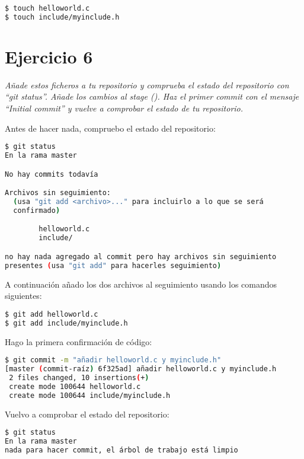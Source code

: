 \begin{lstlisting}[xleftmargin=.16\textwidth,language=bash]
$ touch helloworld.c
$ touch include/myinclude.h
\end{lstlisting}

\section{Ejercicio 6}
\begin{center}
    \parbox{12cm}{\justify\textit{
        Añade estos ficheros a tu repositorio y comprueba el estado del repositorio con “git status”. Añade los cambios al stage (). Haz el primer commit con el mensaje ``Initial commit'' y vuelve a comprobar el estado de tu repositorio.
    }}
\end{center}

Antes de hacer nada, compruebo el estado del repositorio:
\begin{lstlisting}[xleftmargin=.16\textwidth,language=bash]
$ git status
En la rama master

No hay commits todavía

Archivos sin seguimiento:
  (usa "git add <archivo>..." para incluirlo a lo que se será 
  confirmado)

        helloworld.c
        include/

no hay nada agregado al commit pero hay archivos sin seguimiento
presentes (usa "git add" para hacerles seguimiento)
\end{lstlisting}

A continuación añado los dos archivos al seguimiento usando los comandos siguientes:
\begin{lstlisting}[xleftmargin=.16\textwidth,language=bash]
$ git add helloworld.c
$ git add include/myinclude.h
\end{lstlisting}

Hago la primera confirmación de código:
\begin{lstlisting}[xleftmargin=.16\textwidth,language=bash]
$ git commit -m "añadir helloworld.c y myinclude.h"
[master (commit-raíz) 6f325ad] añadir helloworld.c y myinclude.h
 2 files changed, 10 insertions(+)
 create mode 100644 helloworld.c
 create mode 100644 include/myinclude.h
\end{lstlisting}


Vuelvo a comprobar el estado del repositorio:
\begin{lstlisting}[xleftmargin=.16\textwidth,language=bash]
$ git status
En la rama master
nada para hacer commit, el árbol de trabajo está limpio
\end{lstlisting}

